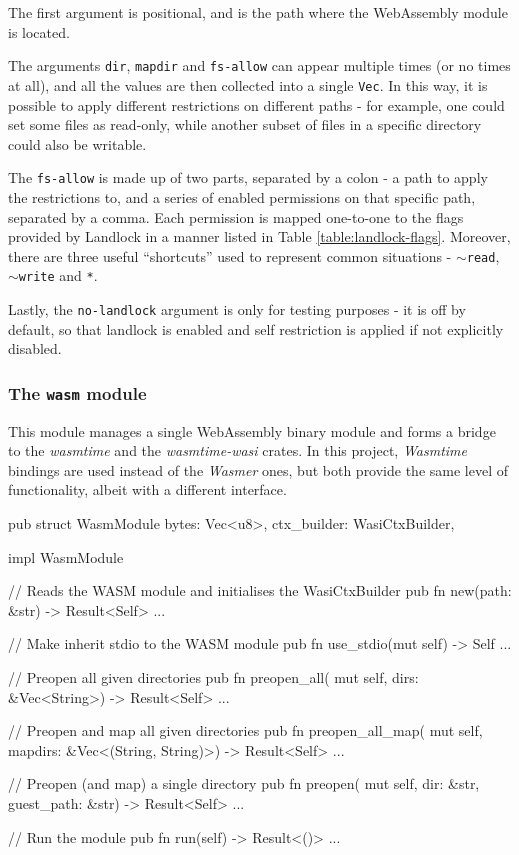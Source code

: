 The first argument is positional, and is the path where the WebAssembly module is located.

The arguments \texttt{dir}, \texttt{mapdir} and \texttt{fs-allow} can appear multiple times (or no times at all), and all the values
are then collected into a single \texttt{Vec}. In this way, it is possible to apply different restrictions on different
paths - for example, one could set some files as read-only, while another subset of files in a specific directory
could also be writable.

The \texttt{fs-allow} is made up of two parts, separated by a colon - a path to apply the restrictions to,
and a series of enabled permissions on that specific path, separated by a comma.
Each permission is mapped one-to-one to the flags provided by Landlock in a manner listed in Table \ref{table:landlock-flags}.
Moreover, there are three useful ``shortcuts'' used to represent common situations - \texttt{$\sim$read}, \texttt{$\sim$write} and \texttt{*}.

Lastly, the \texttt{no-landlock} argument is only for testing purposes - it is off by default, so that
landlock is enabled and self restriction is applied if not explicitly disabled.

\subsubsection{The \texttt{wasm} module}

This module manages a single WebAssembly binary module and forms a bridge to the \textit{wasmtime} and the \textit{wasmtime-wasi}
crates. In this project, \textit{Wasmtime} bindings are used instead of the \textit{Wasmer} ones, but both provide the
same level of functionality, albeit with a different interface.

\begin{code}[language=Rust, caption=The outline of the \texttt{wasm} module]
  pub struct WasmModule {
    bytes: Vec<u8>, ctx_builder: WasiCtxBuilder,
  }
  
  impl WasmModule {
    // Reads the WASM module and initialises the WasiCtxBuilder
    pub fn new(path: &str) -> Result<Self> {...}
  
    // Make inherit stdio to the WASM module
    pub fn use_stdio(mut self) -> Self {...}
  
    // Preopen all given directories
    pub fn preopen_all(
      mut self,
      dirs: &Vec<String>) -> Result<Self> {...}
  
    // Preopen and map all given directories
    pub fn preopen_all_map(
      mut self,
      mapdirs: &Vec<(String, String)>) -> Result<Self> {...}
  
    // Preopen (and map) a single directory
    pub fn preopen(
      mut self,
      dir: &str, guest_path: &str) -> Result<Self> {...}
  
    // Run the module
    pub fn run(self) -> Result<()> {...}
  }  
  \end{code}

